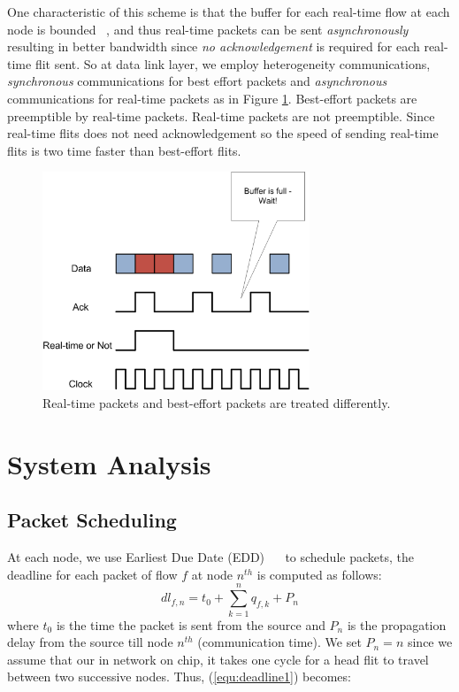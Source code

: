 \documentclass[conference, twocolumn]{IEEEtran}
\theoremstyle{definition}
\begin{document}
One characteristic of this scheme is that the buffer for each 
real-time flow at each node is bounded ~\cite{Ferrari90ascheme}, and thus
real-time packets can be sent {\em asynchronously} resulting in better bandwidth
since {\em no acknowledgement} is required for each real-time flit sent. So at
data link layer, we employ heterogeneity communications, {\em synchronous}
communications for best effort packets and {\em asynchronous} communications
for real-time packets as in Figure \ref{fig:HeteroComm}. Best-effort packets
are preemptible by real-time packets. Real-time packets are not preemptible.
Since real-time flits does not need acknowledgement so the speed of sending
real-time flits is two time faster than best-effort flits.


\begin{figure}[htbp]
\centering
\includegraphics[width=8cm]{pics/HeteroComm.png}
\caption[Heterogeneous Communication for Packets.]
{Real-time packets and best-effort packets are treated
differently.}\label{fig:HeteroComm}
\end{figure}

\section{System Analysis}
\subsection{Packet Scheduling}
At each node, we use Earliest Due Date (EDD)
~\cite{VermaJitter91}~\cite{LiuSchedulingRT} to schedule packets, the deadline
for each packet of flow $f$ at node $n^{th}$ is computed as follows:
\begin{equation}\label{equ:deadline1}
dl_{f,n}=t_0 + \sum_{k=1}^{n}q_{f,k}+P_n
\end{equation}
where $t_0$ is the time the packet is sent from the source and $P_n$ is the propagation
delay from the source till node $n^{th}$ (communication time). We set
$P_n=n$ since we assume that our in network on chip, it takes one cycle for a
head flit to travel between two successive nodes. Thus, (\ref{equ:deadline1}) becomes:
\end{document}
